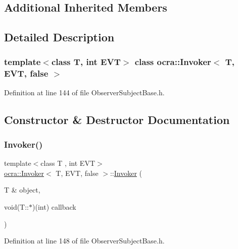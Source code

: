 \subsection*{Additional Inherited Members}


\subsection{Detailed Description}
\subsubsection*{template$<$class T, int E\+VT$>$\newline
class ocra\+::\+Invoker$<$ T, E\+V\+T, false $>$}



Definition at line 144 of file Observer\+Subject\+Base.\+h.



\subsection{Constructor \& Destructor Documentation}
\hypertarget{classocra_1_1Invoker_3_01T_00_01EVT_00_01false_01_4_a913ba3411bdcdb4fa509673eb91de808}{}\label{classocra_1_1Invoker_3_01T_00_01EVT_00_01false_01_4_a913ba3411bdcdb4fa509673eb91de808} 
\subsubsection{\texorpdfstring{Invoker()}{Invoker()}}
{\footnotesize\ttfamily template$<$class T , int E\+VT$>$ \\
\hyperlink{classocra_1_1Invoker}{ocra\+::\+Invoker}$<$ T, E\+VT, false $>$\+::\hyperlink{classocra_1_1Invoker}{Invoker} (\begin{DoxyParamCaption}\item[{T \&}]{object,  }\item[{void(T\+::$\ast$)(int)}]{callback }\end{DoxyParamCaption})\hspace{0.3cm}{\ttfamily [inline]}}



Definition at line 148 of file Observer\+Subject\+Base.\+h.



